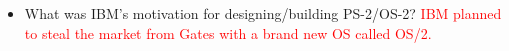 \documentclass[9pt,landscape]{memoir}
\newcommand{\answer}[1]{\textcolor{red}{#1}}
\begin{document}
\begin{multicols}{6}
\begin{itemize}
    \item What was IBM's motivation for designing/building PS-2/OS-2? \answer{IBM planned to steal the market from Gates with a brand new OS called OS/2.}
\end{itemize}

\end{multicols}
\end{document}
